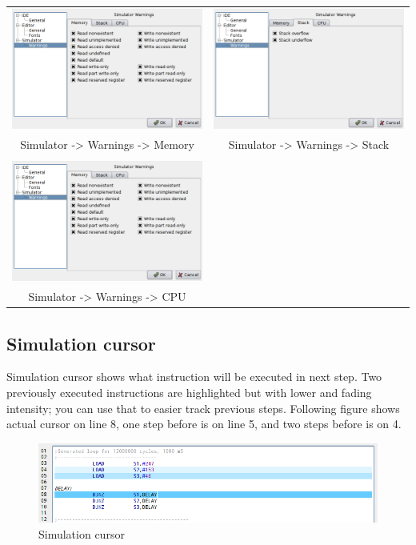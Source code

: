         \begin{table}[h!]
            \begin{tabular}{cc}
                \includegraphics[width=.45\textwidth]{img/interface4.png}
                    &
                \includegraphics[width=.45\textwidth]{img/interface5.png}
                \\ Simulator -> Warnings -> Memory & Simulator -> Warnings -> Stack
                \\
                \\ \includegraphics[width=.5\textwidth]{img/interface4.png}
                \\ Simulator -> Warnings -> CPU
            \end{tabular}
        \end{table}

    \clearpage
    \subsection{Simulation cursor}
        Simulation cursor shows what instruction will be executed in next step. Two previously executed instructions are highlighted but with lower and fading intensity; you can use that to easier track previous steps. Following figure shows actual cursor on line 8, one step before is on line 5, and two steps before is on 4.
        \begin{figure}[h!]
            \centering
            \includegraphics[width=\textwidth]{img/simulationcursor1.png}
            \caption{Simulation cursor}
        \end{figure}

